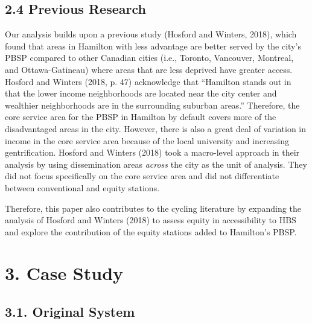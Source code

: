 \documentclass[]{elsarticle} %
\begin{document}
\hypertarget{previous-research}{%
\subsection{2.4 Previous Research}\label{previous-research}}

Our analysis builds upon a previous study (Hosford and Winters, 2018),
which found that areas in Hamilton with less advantage are better served
by the city's PBSP compared to other Canadian cities (i.e., Toronto,
Vancouver, Montreal, and Ottawa-Gatineau) where areas that are less
deprived have greater access. Hosford and Winters (2018, p. 47)
acknowledge that ``Hamilton stands out in that the lower income
neighborhoods are located near the city center and wealthier
neighborhoods are in the surrounding suburban areas.'' Therefore, the
core service area for the PBSP in Hamilton by default covers more of the
disadvantaged areas in the city. However, there is also a great deal of
variation in income in the core service area because of the local
university and increasing gentrification. Hosford and Winters (2018)
took a macro-level approach in their analysis by using dissemination
areas \emph{across} the city as the unit of analysis. They did not focus
specifically on the core service area and did not differentiate between
conventional and equity stations.

Therefore, this paper also contributes to the cycling literature by
expanding the analysis of Hosford and Winters (2018) to assess equity in
accessibility to HBS and explore the contribution of the equity stations
added to Hamilton's PBSP.

\hypertarget{sec:study}{%
\section{3. Case Study}\label{sec:study}}

\hypertarget{original-system}{%
\subsection{3.1. Original System}\label{original-system}}
\end{document}
